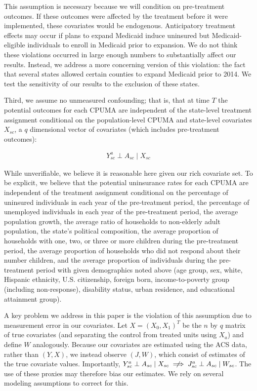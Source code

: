 This assumption is necessary because we will condition on pre-treatment outcomes. If these outcomes were affected by the treatment before it were implemented, these covariates would be endogenous. Anticipatory treatment effects may occur if plans to expand Medicaid induce uninsured but Medicaid-eligible individuals to enroll in Medicaid prior to expansion. We do not think these violations occurred in large enough numbers to substantially affect our results. Instead, we address a more concerning version of this violation: the fact that several states allowed certain counties to expand Medicaid prior to 2014. We test the sensitivity of our results to the exclusion of these states.

Third, we assume no unmeasured confounding; that is, that at time $T$ the potential outcomes for each CPUMA are independent of the state-level treatment assignment conditional on the population-level CPUMA and state-level covariates $X_{sc}$, a $q$ dimensional vector of covariates (which includes pre-treatment outcomes):

\begin{align*}
Y_{sc}^a \perp A_{sc} \mid X_{sc}
\end{align*}

While unverifiable, we believe it is reasonable here given our rich covariate set. To be explicit, we believe that the potential uninsurance rates for each CPUMA are independent of the treatment assignment conditional on the percentage of uninsured individuals in each year of the pre-treatment period, the percentage of unemployed individuals in each year of the pre-treatment period, the average population growth, the average ratio of households to non-elderly adult population, the state's political composition, the average proportion of households with one, two, or three or more children during the pre-treatment period, the average proportion of households who did not respond about their number children, and the average proportion of individuals during the pre-treatment period with given demographics noted above (age group, sex, white, Hispanic ethnicity, U.S. citizenship, foreign born, income-to-poverty group (including non-response), disability status, urban residence, and educational attainment group). 

A key problem we address in this paper is the violation of this assumption due to measurement error in our covariates. Let 
$X = (X_0, X_1)^T$ be the $n$ by $q$ matrix of true covariates (and separating the control from treated units using $X_a$) and define $W$ analogously. Because our covariates are estimated using the ACS data, rather than $(Y, X)$, we instead observe $(J,W)$, which consist of estimates of the true covariate values. Importantly, $Y_{sc}^a \perp A_{sc} \mid X_{sc} \centernot\implies J_{sc}^a \perp A_{sc} \mid W_{sc}$. The use of these proxies may therefore bias our estimates. We rely on several modeling assumptions to correct for this.

